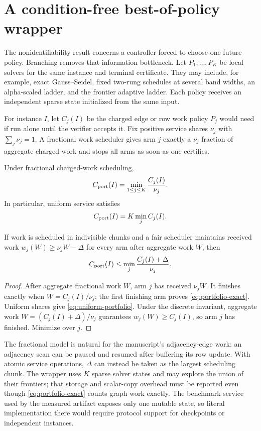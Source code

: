 \section{A condition-free best-of-policy wrapper}
\label{sec:portfolio}

The nonidentifiability result concerns a controller forced to choose one
future policy.  Branching removes that information bottleneck.  Let
$P_1,\ldots,P_K$ be local solvers for the same instance and terminal
certificate.  They may include, for example, exact Gauss--Seidel, fixed
two-rung schedules at several band widths, an alpha-scaled ladder, and the
frontier adaptive ladder.  Each policy receives an independent sparse state
initialized from the same input.

For instance $I$, let $C_j(I)$ be the charged edge or row work policy $P_j$
would need if run alone until the verifier accepts it.  Fix positive service
shares $\nu_j$ with $\sum_j\nu_j=1$.  A fractional work scheduler gives arm
$j$ exactly a $\nu_j$ fraction of aggregate charged work and stops all arms
as soon as one certifies.

\begin{theorem}
\label{thm:portfolio}
Under fractional charged-work scheduling,
\begin{equation}
 C_{\rm port}(I)
 =\min_{1\leq j\leq K}\frac{C_j(I)}{\nu_j}.
 \label{eq:portfolio-exact}
\end{equation}
In particular, uniform service satisfies
\begin{equation}
 C_{\rm port}(I)=K\min_j C_j(I).
 \label{eq:uniform-portfolio}
\end{equation}

If work is scheduled in indivisible chunks and a fair scheduler maintains
received work $w_j(W)\geq\nu_jW-\Delta$ for every arm after aggregate work
$W$, then
\begin{equation}
 C_{\rm port}(I)
 \leq\min_j\frac{C_j(I)+\Delta}{\nu_j}.
 \label{eq:portfolio-discrete}
\end{equation}
\end{theorem}

\begin{proof}
After aggregate fractional work $W$, arm $j$ has received $\nu_jW$.  It
finishes exactly when $W=C_j(I)/\nu_j$; the first finishing arm proves
\eqref{eq:portfolio-exact}.  Uniform shares give
\eqref{eq:uniform-portfolio}.  Under the discrete invariant, aggregate work
$W=(C_j(I)+\Delta)/\nu_j$ guarantees
$w_j(W)\geq C_j(I)$, so arm $j$ has finished.  Minimize over $j$.
\end{proof}

The fractional model is natural for the manuscript's adjacency-edge work:
an adjacency scan can be paused and resumed after buffering its row update.
With atomic service operations, $\Delta$ can instead be taken as the largest
scheduling chunk.  The wrapper uses $K$ sparse solver states and may explore
the union of their frontiers; that storage and scalar-copy overhead must be
reported even though \eqref{eq:portfolio-exact} counts graph work exactly.
The benchmark service used by the measured artifact exposes only one mutable
state, so literal implementation there would require protocol support for
checkpoints or independent instances.

